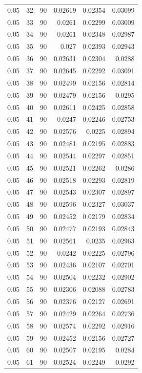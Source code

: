 \begin{tabular}{rrrrrr}
0.05 & 32 & 90 & 0.02619 & 0.02354 & 0.03099 \\
0.05 & 33 & 90 & 0.0261 & 0.02299 & 0.03009 \\
0.05 & 34 & 90 & 0.0261 & 0.02348 & 0.02987 \\
0.05 & 35 & 90 & 0.027 & 0.02393 & 0.02943 \\
0.05 & 36 & 90 & 0.02631 & 0.02304 & 0.0288 \\
0.05 & 37 & 90 & 0.02645 & 0.02292 & 0.03091 \\
0.05 & 38 & 90 & 0.02499 & 0.02156 & 0.02814 \\
0.05 & 39 & 90 & 0.02479 & 0.02156 & 0.0295 \\
0.05 & 40 & 90 & 0.02611 & 0.02425 & 0.02858 \\
0.05 & 41 & 90 & 0.0247 & 0.02246 & 0.02753 \\
0.05 & 42 & 90 & 0.02576 & 0.0225 & 0.02894 \\
0.05 & 43 & 90 & 0.02481 & 0.02195 & 0.02883 \\
0.05 & 44 & 90 & 0.02544 & 0.02297 & 0.02851 \\
0.05 & 45 & 90 & 0.02521 & 0.02262 & 0.0286 \\
0.05 & 46 & 90 & 0.02518 & 0.02293 & 0.02819 \\
0.05 & 47 & 90 & 0.02543 & 0.02307 & 0.02897 \\
0.05 & 48 & 90 & 0.02596 & 0.02327 & 0.03037 \\
0.05 & 49 & 90 & 0.02452 & 0.02179 & 0.02834 \\
0.05 & 50 & 90 & 0.02477 & 0.02193 & 0.02843 \\
0.05 & 51 & 90 & 0.02561 & 0.0235 & 0.02963 \\
0.05 & 52 & 90 & 0.0242 & 0.02225 & 0.02796 \\
0.05 & 53 & 90 & 0.02436 & 0.02107 & 0.02701 \\
0.05 & 54 & 90 & 0.02504 & 0.02232 & 0.02902 \\
0.05 & 55 & 90 & 0.02306 & 0.02088 & 0.02783 \\
0.05 & 56 & 90 & 0.02376 & 0.02127 & 0.02691 \\
0.05 & 57 & 90 & 0.02429 & 0.02264 & 0.02736 \\
0.05 & 58 & 90 & 0.02574 & 0.02292 & 0.02916 \\
0.05 & 59 & 90 & 0.02452 & 0.02156 & 0.02727 \\
0.05 & 60 & 90 & 0.02507 & 0.02195 & 0.0284 \\
0.05 & 61 & 90 & 0.02524 & 0.02249 & 0.0292 \\

\end{tabular}
